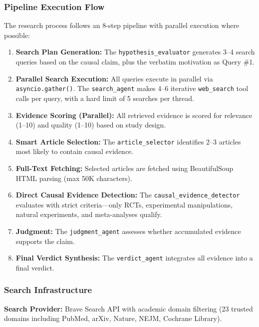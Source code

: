 

\subsubsection{Pipeline Execution Flow}

The research process follows an 8-step pipeline with parallel execution where possible:

\begin{enumerate}[noitemsep]
    \item \textbf{Search Plan Generation:} The \texttt{hypothesis\_evaluator} generates 3--4 search queries based on the causal claim, plus the verbatim motivation as Query \#1.
    \item \textbf{Parallel Search Execution:} All queries execute in parallel via \texttt{asyncio.gather()}. The \texttt{search\_agent} makes 4--6 iterative \texttt{web\_search} tool calls per query, with a hard limit of 5 searches per thread.
    \item \textbf{Evidence Scoring (Parallel):} All retrieved evidence is scored for relevance (1--10) and quality (1--10) based on study design.
    \item \textbf{Smart Article Selection:} The \texttt{article\_selector} identifies 2--3 articles most likely to contain causal evidence.
    \item \textbf{Full-Text Fetching:} Selected articles are fetched using BeautifulSoup HTML parsing (max 50K characters).
    \item \textbf{Direct Causal Evidence Detection:} The \texttt{causal\_evidence\_detector} evaluates with strict criteria---only RCTs, experimental manipulations, natural experiments, and meta-analyses qualify.
    \item \textbf{Judgment:} The \texttt{judgment\_agent} assesses whether accumulated evidence supports the claim.
    \item \textbf{Final Verdict Synthesis:} The \texttt{verdict\_agent} integrates all evidence into a final verdict.
\end{enumerate}

\subsubsection{Search Infrastructure}

\textbf{Search Provider:} Brave Search API with academic domain filtering (23 trusted domains including PubMed, arXiv, Nature, NEJM, Cochrane Library).

